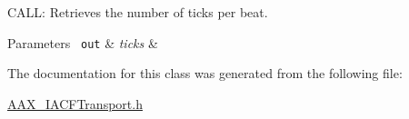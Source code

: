C\+A\+LL\+: Retrieves the number of ticks per beat. 


\begin{DoxyParams}[1]{Parameters}
\mbox{\texttt{ out}}  & {\em ticks} & \\
\hline
\end{DoxyParams}


The documentation for this class was generated from the following file\+:\begin{DoxyCompactItemize}
\item 
\mbox{\hyperlink{a00557}{A\+A\+X\+\_\+\+I\+A\+C\+F\+Transport.\+h}}\end{DoxyCompactItemize}
